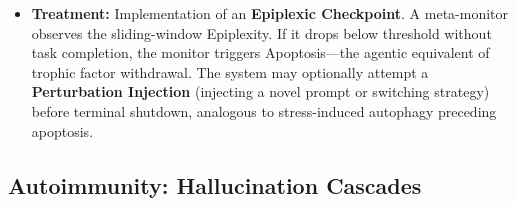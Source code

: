 \begin{itemize}[leftmargin=*]
The mixing parameter $\alpha \in [0,1]$ balances semantic novelty (embedding distance) against linguistic
surprise (perplexity). In the absence of task-specific calibration, we use $\alpha = 0.5$ as a neutral
default that weights the two signals equally. The choice of $\alpha$ and threshold $\delta$ is empirical
and may vary across models and task families. In practice:
\begin{itemize}[leftmargin=*]
\item High $\alpha$: Sensitive to semantic repetition (same meaning, different words)
\item Low $\alpha$: Sensitive to linguistic repetition (same phrases, possibly different context)
\end{itemize}
Both terms approaching zero indicate stagnation.

\textbf{Windowed Detection.} To distinguish genuine convergence (task completion) from pathological
loops, we compute the \textbf{Epiplexic Integral} over a sliding window of $k$ steps:
\begin{equation}
\mathcal{E}_{\text{window}} = \frac{1}{k}\sum_{i=t-k+1}^{t} \hat{\mathcal{E}}_i
\label{eq:epiplexic-integral}
\end{equation}
Apoptosis triggers when $\mathcal{E}_{\text{window}} < \delta$ \textit{and} no terminal action
(task completion, user handoff) has been signaled.

\item \textbf{Treatment:} Implementation of an \textbf{Epiplexic Checkpoint}. A meta-monitor observes the
sliding-window Epiplexity. If it drops below threshold without task completion, the monitor triggers
Apoptosis---the agentic equivalent of trophic factor withdrawal. The system may optionally attempt a
\textbf{Perturbation Injection} (injecting a novel prompt or switching strategy) before terminal shutdown,
analogous to stress-induced autophagy preceding apoptosis.
\end{itemize}

\subsection{Autoimmunity: Hallucination Cascades}

